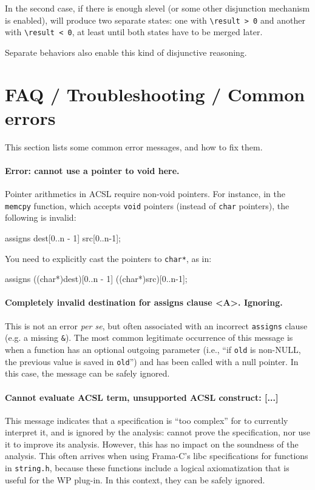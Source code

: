 \documentclass{frama-c-book}
\begin{document}
In the second case, if there is enough slevel (or some other disjunction
mechanism is enabled), \Eva{} will produce two separate states: one with
\verb+\result > 0+ and another with \verb+\result < 0+,
at least until both states have to be merged later.

Separate behaviors also enable this kind of disjunctive reasoning.

\section{FAQ / Troubleshooting / Common errors}
\label{sec:acsl-guide-faq}

This section lists some common error messages, and how to fix them.

\paragraph{Error: cannot use a pointer to void here.}
Pointer arithmetics in ACSL require non-void pointers. For instance,
in the \texttt{memcpy} function, which accepts \texttt{void} pointers
(instead of \texttt{char} pointers), the following is invalid:

\begin{listing-nonumber}
  assigns dest[0..n - 1] \from src[0..n-1];
\end{listing-nonumber}

You need to explicitly cast the pointers to \texttt{char*}, as in:

\begin{listing-nonumber}
  assigns ((char*)dest)[0..n - 1] \from ((char*)src)[0..n-1];
\end{listing-nonumber}

\paragraph{Completely invalid destination for assigns clause <A>. Ignoring.}
This is not an error {\em per se}, but often associated with an incorrect
\texttt{assigns} clause (e.g. a missing \texttt{\&}). The most common
legitimate occurrence of this message is when a function has an
optional outgoing parameter (i.e., ``if \texttt{old} is non-NULL, the previous
value is saved in \texttt{old}'') and has been called with a null pointer.
In this case, the message can be safely ignored.

\paragraph{Cannot evaluate ACSL term, unsupported ACSL construct: [...]}
This message indicates that a specification is ``too complex'' for \Eva{} to
currently interpret it, and is ignored by the analysis:
\Eva{} cannot prove the specification, nor use it to improve its analysis.
However, this has no impact on the soundness of the analysis.
This often arrives when using Frama-C's libc specifications for functions in
\texttt{string.h}, because these functions include a logical axiomatization
that is useful for the \textsf{WP} plug-in.
In this context, they can be safely ignored.
\end{document}
